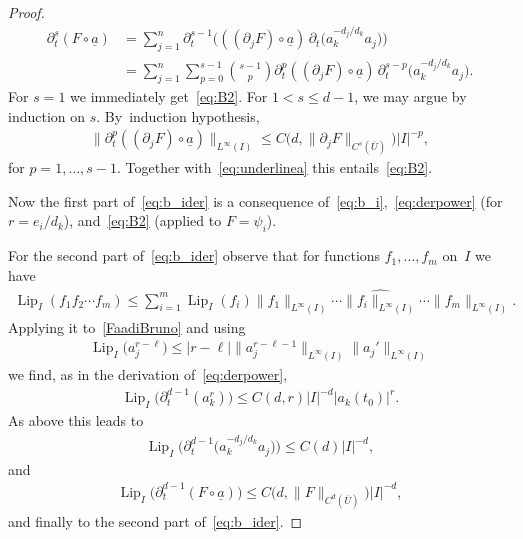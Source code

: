 \documentclass[11pt]{article}
\numberwithin{equation}{section}
\numberwithin{equation}{section}
\def\ps{\psi}
\def\p{\partial}
\def\ul{\underline}
\def\Lip{\on{Lip}}
\renewcommand{\o}{\circ}
\let\on=\operatorname
\begin{document}
\begin{proof}
\begin{align*}
 \p_t^s (F \o \ul a)
 &= \sum_{j=1}^n \p_t^{s-1}\Big(((\p_{j} F)\o \ul a)\, \p_t \big( a_k^{- d_j/d_k} a_j\big)\Big)
 \\
 &= \sum_{j=1}^n \sum_{p=0}^{s-1}
 \binom{s-1}{p} \p_t^{p}((\p_{j} F)\o \ul a)\, \p_t^{s- p} \big( a_k^{- d_j/d_k} a_j\big).
 \end{align*}
 For $s=1$ we immediately get~\eqref{eq:B2}. For $1< s \le d-1$, we may argue by induction on $s$. By~induction hypothesis,
 \begin{gather*}
 \|\p_t^{p}((\p_{j} F)\o \ul a)\|_{L^\infty(I)} \le C\big(d,\|\p_{j} F\|_{C^{s}(\overline U)}\big) |I|^{-p},
 \end{gather*}
 for $p = 1,\dots,s-1$. Together with~\eqref{eq:underlinea} this entails~\eqref{eq:B2}.





 Now the first part of~\eqref{eq:b_ider} is a consequence of~\eqref{eq:b_i},~\eqref{eq:derpower} (for $r = e_i/d_k$),
 and~\eqref{eq:B2} (applied to $F= \ps_i$).




For the second part of~\eqref{eq:b_ider}
observe that for functions $f_1,\dots,f_m$ on~$I$ we have
\begin{gather*}
 \Lip_I(f_1 f_2 \cdots f_m) \le \sum_{i=1}^m \Lip_I(f_i) \|f_1\|_{L^{\infty}(I)} \cdots \widehat{\|f_i\|_{L^{\infty}(I)}}
 \cdots \|f_m\|_{L^{\infty}(I)}.
\end{gather*}
Applying it to~\eqref{FaadiBruno} and using
\begin{gather*}
 \Lip_I\big(a_j^{r-\ell}\big) \le |r-\ell| \|a_j^{r-\ell-1} \|_{L^\infty(I)} \| a_j'\|_{L^\infty(I)}
\end{gather*}
we find, as in the derivation of~\eqref{eq:derpower},
\begin{gather*}
 \Lip_I\big(\p_t^{d-1}( a_k^r)\big) \le C(d,r) |I|^{-d} |a_k(t_0)|^{r}.
\end{gather*}
As above this leads to
\begin{gather*}
 \Lip_I\big(\p_t^{d-1} \big( a_k^{- d_j/d_k} a_j\big) \big)
 \le C(d) |I|^{-d},
 \end{gather*}
and
\begin{gather*}
 \Lip_I \big(\p_t^{d-1}(F \o \ul a)\big) \le C\big(d, \|F\|_{C^d(\overline U)}\big) |I|^{-d},
\end{gather*}
and finally to the second part of~\eqref{eq:b_ider}.
\end{proof}
\end{document}
